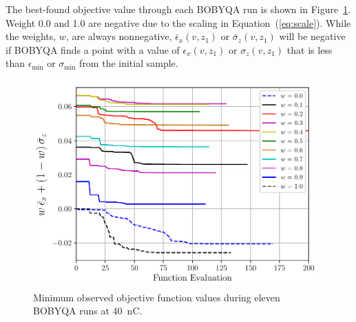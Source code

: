 The best-found objective value through each BOBYQA run is shown in Figure~\ref{fig:iterations}. 
Weight 0.0 and 1.0 are negative due to the scaling in Equation~(\ref{eq:scale}). While the weights, $w$, are always nonnegative, 
$\bar{\epsilon}_x (v,z_1)$ or $\bar{\sigma}_z(v,z_1)$ will be negative if BOBYQA finds a point with a value of 
$\epsilon_x(v,z_1)$ or $\sigma_z(v,z_1)$ that is less than $\epsilon_{\min}$ or $\sigma_{\min}$ from the initial sample. 
\begin{figure}[h]
	\captionsetup{width=0.98\linewidth}
	\begin{center}
		\includegraphics[width=0.98\textwidth]{images/THPAB155f2}
		\caption{\label{fig:iterations}Minimum observed objective function values during eleven BOBYQA runs at \SI{40}{nC}.}
	\end{center}
\end{figure}

